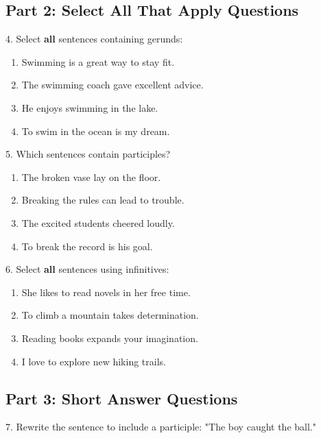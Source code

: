 \documentclass[12pt]{article}
\begin{document}
\vspace{1cm}

\subsection*{Part 2: Select All That Apply Questions}

4. Select \textbf{all} sentences containing gerunds:  
\begin{enumerate}[label=\Alph*.]
    \item Swimming is a great way to stay fit.  
    \item The swimming coach gave excellent advice.  
    \item He enjoys swimming in the lake.  
    \item To swim in the ocean is my dream.  
\end{enumerate}

\vspace{1cm}

5. Which sentences contain participles?  
\begin{enumerate}[label=\Alph*.]
    \item The broken vase lay on the floor.  
    \item Breaking the rules can lead to trouble.  
    \item The excited students cheered loudly.  
    \item To break the record is his goal.  
\end{enumerate}

\vspace{1cm}

6. Select \textbf{all} sentences using infinitives:  
\begin{enumerate}[label=\Alph*.]
    \item She likes to read novels in her free time.  
    \item To climb a mountain takes determination.  
    \item Reading books expands your imagination.  
    \item I love to explore new hiking trails.  
\end{enumerate}

\vspace{1cm}
\newpage
\subsection*{Part 3: Short Answer Questions}

7. Rewrite the sentence to include a participle:  
"The boy caught the ball."  
\vspace{4cm}
\end{document}
